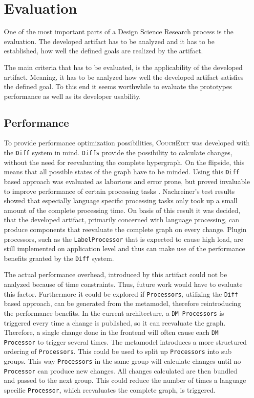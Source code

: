 \chapter{Evaluation}
\label{chap:evaluation}
One of the most important parts of a Design Science Research process is the evaluation. The developed artifact has to be analyzed and it has to be established, how well the defined goals are realized by the artifact.

The main criteria that has to be evaluated, is the applicability of the developed artifact. Meaning, it has to be analyzed how well the developed artifact satisfies the defined goal. To this end it seems worthwhile to evaluate the prototypes performance as well as its developer usability. 

\section{Performance}
To provide performance optimization possibilities, \textsc{CouchEdit} was developed with the \texttt{Diff} system in mind. \texttt{Diffs} provide the possibility to calculate changes, without the need for reevaluating the complete hypergraph. On the flipside, this means that all possible states of the graph have to be minded. Using this \texttt{Diff} based approach was evaluated as laborious and error prone, but proved invaluable to improve performance of certain processing tasks \cite{nachreiner_couchedit_2020}. Nachreiner's test results showed that especially language specific processing tasks only took up a small amount of the complete processing time. On basis of this result it was decided, that the developed artifact, primarily concerned with language processing, can produce components that reevaluate the complete graph on every change. Plugin processors, such as the \texttt{LabelProcessor} that is expected to cause high load, are still implemented on application level and thus can make use of the performance benefits granted by the \texttt{Diff} system. 

The actual performance overhead, introduced by this artifact could not be analyzed because of time constraints. Thus, future work would have to evaluate this factor. Furthermore it could be explored if \texttt{Processors}, utilizing the \texttt{Diff} based approach, can be generated from the metamodel, therefore reintroducing the performance benefits. In the current architecture, a \texttt{DM Processors} is triggered every time a change is published, so it can reevaluate the graph. Therefore, a single change done in the frontend will often cause each \texttt{DM Processor} to trigger several times. The metamodel introduces a more structured ordering of \texttt{Processors}. This could be used to split up \texttt{Processors} into sub groups. This way \texttt{Processors} in the same group will calculate changes until no \texttt{Processor} can produce new changes. All changes calculated are then bundled and passed to the next group. This could reduce the number of times a language specific \texttt{Processor}, which reevaluates the complete graph, is triggered.  


